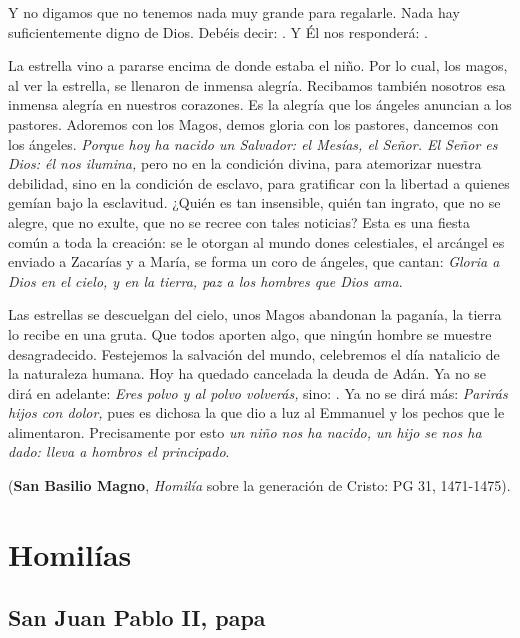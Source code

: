\begin{body}
\begin{body}
Y no digamos que no tenemos nada muy grande para regalarle. Nada hay suficientemente digno de Dios. Debéis decir: . Y Él nos responderá: .

La estrella vino a pararse encima de donde estaba el niño. Por lo cual, los magos, al ver la estrella, se llenaron de inmensa alegría. Recibamos también nosotros esa inmensa alegría en nuestros corazones. Es la alegría que los ángeles anuncian a los pastores. Adoremos con los Magos, demos gloria con los pastores, dancemos con los ángeles. \emph{Porque hoy ha nacido un Salvador: el Mesías, el Señor. El Señor es Dios: él nos ilumina,} pero no en la condición divina, para atemorizar nuestra debilidad, sino en la condición de esclavo, para gratificar con la libertad a quienes gemían bajo la esclavitud. ¿Quién es tan insensible, quién tan ingrato, que no se alegre, que no exulte, que no se recree con tales noticias? Esta es una fiesta común a toda la creación: se le otorgan al mundo dones celestiales, el arcángel es enviado a Zacarías y a María, se forma un coro de ángeles, que cantan: \emph{Gloria a Dios en el cielo, y en la tierra, paz a los hombres que Dios ama}.

Las estrellas se descuelgan del cielo, unos Magos abandonan la paganía, la tierra lo recibe en una gruta. Que todos aporten algo, que ningún hombre se muestre desagradecido. Festejemos la salvación del mundo, celebremos el día natalicio de la naturaleza humana. Hoy ha quedado cancelada la deuda de Adán. Ya no se dirá en adelante: \emph{Eres polvo y al polvo volverás,} sino: . Ya no se dirá más: \emph{Parirás hijos con dolor,} pues es dichosa la que dio a luz al Emmanuel y los pechos que le alimentaron. Precisamente por esto \emph{un niño nos ha nacido, un hijo se nos ha dado: lleva a hombros el principado}.

(\textbf{San Basilio Magno}, \emph{Homilía} sobre la generación de Cristo: PG 31, 1471-1475).

\section{Homilías}

\subsection{San Juan Pablo II, papa}


\end{body}
\end{body}
